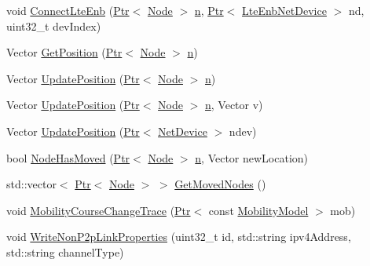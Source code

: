 \begin{DoxyCompactItemize}
void \hyperlink{classns3_1_1AnimationInterface_adf464333f57bcf13efca2af8b47f0ac7}{Connect\+Lte\+Enb} (\hyperlink{classns3_1_1Ptr}{Ptr}$<$ \hyperlink{classns3_1_1Node}{Node} $>$ \hyperlink{lte__link__budget__x2__handover__measures_8m_abdb05bc5a064cf642a06c83b3392f148}{n}, \hyperlink{classns3_1_1Ptr}{Ptr}$<$ \hyperlink{classns3_1_1LteEnbNetDevice}{Lte\+Enb\+Net\+Device} $>$ nd, uint32\+\_\+t dev\+Index)
\item 
Vector \hyperlink{classns3_1_1AnimationInterface_abbbc42cea6e83f54004d4722395e8ee3}{Get\+Position} (\hyperlink{classns3_1_1Ptr}{Ptr}$<$ \hyperlink{classns3_1_1Node}{Node} $>$ \hyperlink{lte__link__budget__x2__handover__measures_8m_abdb05bc5a064cf642a06c83b3392f148}{n})
\item 
Vector \hyperlink{classns3_1_1AnimationInterface_ab751cf6f459289f0978f4bb97b93044d}{Update\+Position} (\hyperlink{classns3_1_1Ptr}{Ptr}$<$ \hyperlink{classns3_1_1Node}{Node} $>$ \hyperlink{lte__link__budget__x2__handover__measures_8m_abdb05bc5a064cf642a06c83b3392f148}{n})
\item 
Vector \hyperlink{classns3_1_1AnimationInterface_a202a22b4e680141d5845c3e8a681d512}{Update\+Position} (\hyperlink{classns3_1_1Ptr}{Ptr}$<$ \hyperlink{classns3_1_1Node}{Node} $>$ \hyperlink{lte__link__budget__x2__handover__measures_8m_abdb05bc5a064cf642a06c83b3392f148}{n}, Vector v)
\item 
Vector \hyperlink{classns3_1_1AnimationInterface_ad0ebfa7e3a5f00df741292976e4af078}{Update\+Position} (\hyperlink{classns3_1_1Ptr}{Ptr}$<$ \hyperlink{classns3_1_1NetDevice}{Net\+Device} $>$ ndev)
\item 
bool \hyperlink{classns3_1_1AnimationInterface_a0c0a9704e373d1cc4d3a00108b3daff4}{Node\+Has\+Moved} (\hyperlink{classns3_1_1Ptr}{Ptr}$<$ \hyperlink{classns3_1_1Node}{Node} $>$ \hyperlink{lte__link__budget__x2__handover__measures_8m_abdb05bc5a064cf642a06c83b3392f148}{n}, Vector new\+Location)
\item 
std\+::vector$<$ \hyperlink{classns3_1_1Ptr}{Ptr}$<$ \hyperlink{classns3_1_1Node}{Node} $>$ $>$ \hyperlink{classns3_1_1AnimationInterface_a8300c09c59cb4030840a9b1dc683cdc3}{Get\+Moved\+Nodes} ()
\item 
void \hyperlink{classns3_1_1AnimationInterface_aa1b50061a3743f10ef7c2c59040022e4}{Mobility\+Course\+Change\+Trace} (\hyperlink{classns3_1_1Ptr}{Ptr}$<$ const \hyperlink{classns3_1_1MobilityModel}{Mobility\+Model} $>$ mob)
\item 
void \hyperlink{classns3_1_1AnimationInterface_a7b7b440a439803c362f86201dd36d091}{Write\+Non\+P2p\+Link\+Properties} (uint32\+\_\+t id, std\+::string ipv4\+Address, std\+::string channel\+Type)

\end{DoxyCompactItemize}
